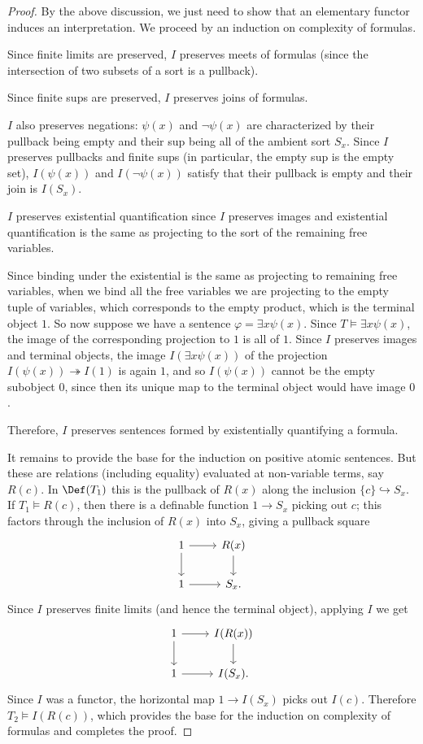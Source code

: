 \begin{proof}
  By the above discussion, we just need to show that an elementary functor induces an interpretation. We proceed by an induction on complexity of formulas.

  Since finite limits are preserved, $I$ preserves meets of formulas (since the intersection of two subsets of a sort is a pullback).

  Since finite sups are preserved, \(I\) preserves joins of formulas.

  $I$ also preserves negations: $\psi(x)$ and $\neg \psi(x)$ are characterized by their pullback being empty and their sup being all of the ambient sort $S_x$. Since $I$ preserves pullbacks and finite sups (in particular, the empty sup is the empty set), $I(\psi(x))$ and $I(\neg \psi(x))$ satisfy that their pullback is empty and their join is $I(S_x)$.  

  $I$ preserves existential quantification since $I$ preserves images and existential quantification is the same as projecting to the sort of the remaining free variables.

  Since binding under the existential is the same as projecting to remaining free variables, when we bind all the free variables we are projecting to the empty tuple of variables, which corresponds to the empty product, which is the terminal object $1$. So now suppose we have a sentence $\varphi = \exists x \psi(x)$. Since $T \models \exists x \psi(x)$, the image of the corresponding projection to $1$ is all of $1$. Since $I$ preserves images and terminal objects, the image $I(\exists x \psi(x))$ of the projection $I(\psi(x)) \twoheadrightarrow I(1)$ is again $1$, and so $I(\psi(x))$ cannot be the empty subobject $0$, since then its unique map to the terminal object would have image $0$.

  Therefore, $I$ preserves sentences formed by existentially quantifying a formula.

  It remains to provide the base for the induction on positive atomic sentences. But these are relations (including equality) evaluated at non-variable terms, say $R(c)$. In $\Def(T_1)$ this is the pullback of $R(x)$ along the inclusion $\{c\} \hookrightarrow S_x$. If $T_1 \models R(c)$, then there is a definable function $1 \to S_x$ picking out $c$; this factors through the inclusion of $R(x)$ into $S_x$, giving a pullback square
  $$
  \begin{tikzcd}[ampersand replacement =\&]
1 \arrow{r} \arrow{d}     \&R(x) \arrow{d} \\
1    \arrow{r}\& S_x.
    \end{tikzcd}
    $$
    Since $I$ preserves finite limits (and hence the terminal object), applying $I$ we get
      $$
  \begin{tikzcd}[ampersand replacement =\&]
1 \arrow{r} \arrow{d}     \&I(R(x)) \arrow{d} \\
1    \arrow{r}\& I(S_x).
    \end{tikzcd}
    $$
    Since $I$ was a functor, the horizontal map $1 \to I(S_x)$ picks out $I(c)$. Therefore $T_2 \models I(R(c))$, which provides the base for the induction on complexity of formulas and completes the proof.
  \end{proof}

